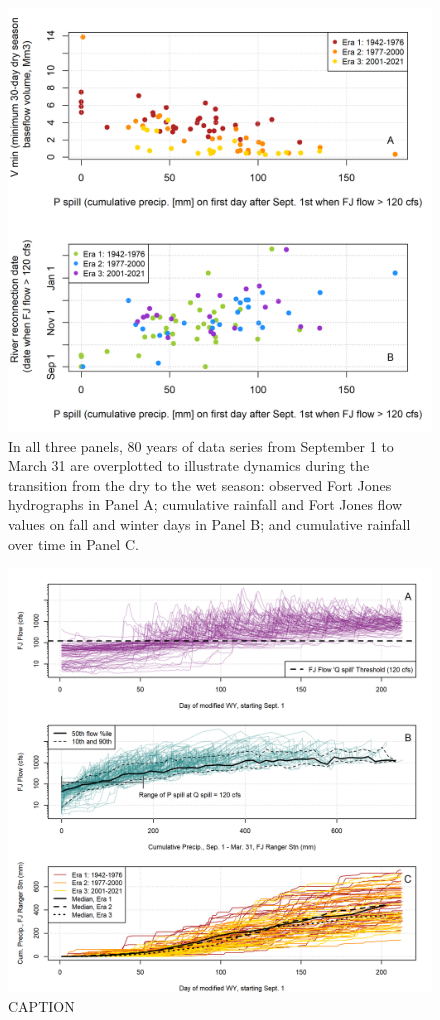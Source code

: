 \documentclass[
]{article}
\begin{document}
\begin{figure}
\includegraphics[width=1\linewidth]{f04} \caption{\label{fig:time_v_fall_rains_v_flow_fig} In all three panels, 80 years of data series from September 1 to March 31 are overplotted to illustrate dynamics during the transition from the dry to the wet season: observed Fort Jones hydrographs in Panel A; cumulative rainfall and Fort Jones flow values on fall and winter days in Panel B; and cumulative rainfall over time in Panel C.}\label{fig:time_v_fall_rains_v_flow_fig}
\end{figure}

\begin{figure}
\includegraphics[width=1\linewidth]{f05} \caption{\label{fig:qspill_figs} CAPTION}\label{fig:qspill_figs}
\end{figure}
\end{document}
